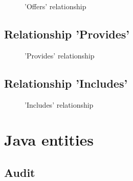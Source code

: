\begin{minipage}[h]{0.5\textwidth}
    \begin{figure}[H]
        
        \caption{'Offers' relationship}
        \label{fig:orm_sp_op}
    \end{figure}
\end{minipage}
\hfill
\begin{minipage}[h]{0.45\textwidth}
    \blindtext
\end{minipage}

\subsection*{Relationship 'Provides'}

\begin{minipage}[h]{0.5\textwidth}
    \begin{figure}[H]
        
        \caption{'Provides' relationship}
        \label{fig:orm_sp_vp}
    \end{figure}
\end{minipage}
\hfill
\begin{minipage}[h]{0.45\textwidth}
    \blindtext
\end{minipage}

\subsection*{Relationship 'Includes'}

\begin{minipage}[h]{0.5\textwidth}
    \begin{figure}[H]
        
        \caption{'Includes' relationship}
        \label{fig:orm_sp_s}
    \end{figure}
\end{minipage}
\hfill
\begin{minipage}[h]{0.45\textwidth}
    \blindtext
\end{minipage}


\section{Java entities}
\label{sec:java_ent}

\subsection*{Audit}

